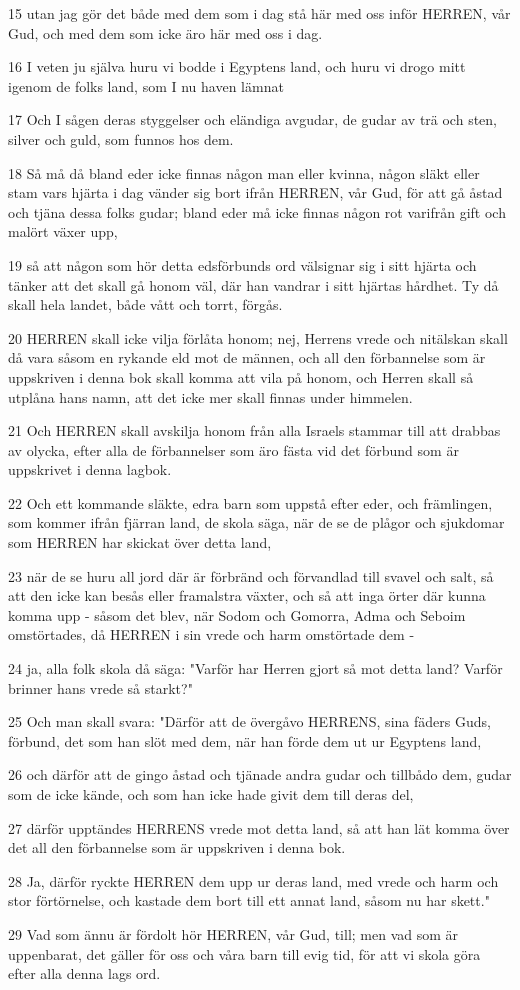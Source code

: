 \par 15 utan jag gör det både med dem som i dag stå här med oss inför HERREN, vår Gud, och med dem som icke äro här med oss i dag.
\par 16 I veten ju själva huru vi bodde i Egyptens land, och huru vi drogo mitt igenom de folks land, som I nu haven lämnat
\par 17 Och I sågen deras styggelser och eländiga avgudar, de gudar av trä och sten, silver och guld, som funnos hos dem.
\par 18 Så må då bland eder icke finnas någon man eller kvinna, någon släkt eller stam vars hjärta i dag vänder sig bort ifrån HERREN, vår Gud, för att gå åstad och tjäna dessa folks gudar; bland eder må icke finnas någon rot varifrån gift och malört växer upp,
\par 19 så att någon som hör detta edsförbunds ord välsignar sig i sitt hjärta och tänker att det skall gå honom väl, där han vandrar i sitt hjärtas hårdhet. Ty då skall hela landet, både vått och torrt, förgås.
\par 20 HERREN skall icke vilja förlåta honom; nej, Herrens vrede och nitälskan skall då vara såsom en rykande eld mot de männen, och all den förbannelse som är uppskriven i denna bok skall komma att vila på honom, och Herren skall så utplåna hans namn, att det icke mer skall finnas under himmelen.
\par 21 Och HERREN skall avskilja honom från alla Israels stammar till att drabbas av olycka, efter alla de förbannelser som äro fästa vid det förbund som är uppskrivet i denna lagbok.
\par 22 Och ett kommande släkte, edra barn som uppstå efter eder, och främlingen, som kommer ifrån fjärran land, de skola säga, när de se de plågor och sjukdomar som HERREN har skickat över detta land,
\par 23 när de se huru all jord där är förbränd och förvandlad till svavel och salt, så att den icke kan besås eller framalstra växter, och så att inga örter där kunna komma upp - såsom det blev, när Sodom och Gomorra, Adma och Seboim omstörtades, då HERREN i sin vrede och harm omstörtade dem -
\par 24 ja, alla folk skola då säga: "Varför har Herren gjort så mot detta land? Varför brinner hans vrede så starkt?"
\par 25 Och man skall svara: "Därför att de övergåvo HERRENS, sina fäders Guds, förbund, det som han slöt med dem, när han förde dem ut ur Egyptens land,
\par 26 och därför att de gingo åstad och tjänade andra gudar och tillbådo dem, gudar som de icke kände, och som han icke hade givit dem till deras del,
\par 27 därför upptändes HERRENS vrede mot detta land, så att han lät komma över det all den förbannelse som är uppskriven i denna bok.
\par 28 Ja, därför ryckte HERREN dem upp ur deras land, med vrede och harm och stor förtörnelse, och kastade dem bort till ett annat land, såsom nu har skett."
\par 29 Vad som ännu är fördolt hör HERREN, vår Gud, till; men vad som är uppenbarat, det gäller för oss och våra barn till evig tid, för att vi skola göra efter alla denna lags ord.

